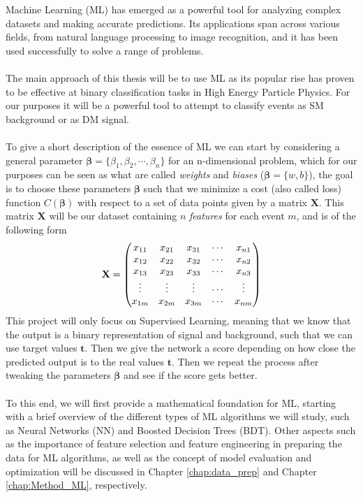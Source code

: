 \documentclass[12pt, a4paper]{book}
\begin{document}
Machine Learning (ML) has emerged as a powerful tool for analyzing complex datasets and making accurate predictions. Its applications span across various fields, from natural language processing to image recognition, and it has been used successfully to solve a range of problems. \\
\\The main approach of this thesis will be to use ML as its popular rise has proven to be effective at binary classification tasks \cite{Baldi_2016, DeepLearing} in High Energy Particle Physics. 
For our purposes it will be a powerful tool to attempt to classify events as SM background or as DM signal.\\
\\To give a short description of the essence of ML we can start by considering a general parameter $\bm{\beta} = \{\beta_1,\beta_2,\cdots,\beta_n\}$ for an n-dimensional problem, which for our purposes can be seen as what are called \textit{weights} and \textit{biases} 
($\bm \beta = \{w, b\}$), 
the goal is to choose these parameters $\bm{\beta}$ such that we minimize a cost (also called loss) function $C(\bm{\beta})$ with respect to a set of data points given by a matrix $\mathbf{X}$. This matrix $\mathbf{X}$ will be 
our dataset containing $n$ \textit{features} for each event $m$, and is of the following form 
\begin{equation}\label{eq:dataset}
    \bf X = \begin{pmatrix}
        x_{11} & x_{21} & x_{31} & \cdots & x_{n1}\\
        x_{12} & x_{22} & x_{32} & \cdots & x_{n2}\\
        x_{13} & x_{23} & x_{33} & \cdots & x_{n3}\\
        \vdots & \vdots & \vdots & \cdots & \vdots\\
        x_{1m} & x_{2m} & x_{3m} & \cdots & x_{nm}\\  
    \end{pmatrix}    
\end{equation}
This project will only focus on Supervised Learning, meaning that we know that the output is a binary representation of signal and background, such that we can use target values $\bm{t}$. 
Then we give the network a score depending on how close the predicted output is to the real values $\bm t $. Then we repeat the process after tweaking the parameters $\bm \beta $ and see if the score gets better.\\
\\To this end, we will first provide a mathematical foundation for ML, starting with a brief overview of the different types of ML algorithms we will study, such as Neural Networks (NN) and Boosted Decision Trees (BDT). 
Other aspects such as the importance of feature selection and feature engineering in preparing the data for ML algorithms, as well as the concept of model evaluation and optimization will be discussed in Chapter \ref{chap:data_prep} and Chapter \ref{chap:Method_ML}, respectively.
\end{document}
